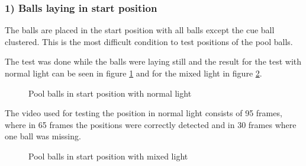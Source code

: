 \subsubsection{ 1) Balls laying in start position}
The balls are placed in the start position with all balls except the cue ball clustered. This is the most difficult condition to test positions of the pool balls.

The test was done while the balls were laying still and the result for the test with normal light can be seen in figure \ref{fig:poolposstart} and for the mixed light in figure \ref{fig:poolposstart2}.

\begin{figure}[H]
  \centering
\quad
\quad
   \caption{Pool balls in start position with normal light}
  \label{fig:poolposstart}
\end{figure}

The video used for testing the position in normal light consists of 95 frames, where in 65 frames the positions were correctly detected and in 30 frames where one ball was missing.

\begin{figure}[H]
  \centering
\quad
\quad
   \caption{Pool balls in start position with mixed light}
  \label{fig:poolposstart2}
\end{figure}

